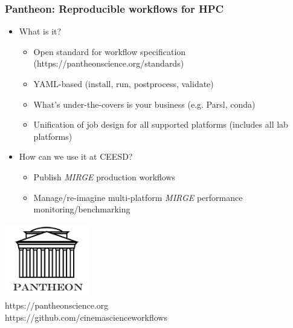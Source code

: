 \begin{frame}\frametitle{Pantheon: Reproducible workflows for HPC}
\begin{multicols}{2}
\begin{itemize}
\item What is it?
\begin{itemize}
\item Open standard for workflow specification (https://pantheonscience.org/standards)
\item YAML-based (install, run, postprocess, validate)
\item What's under-the-covers is your business  (e.g. Parsl, conda)
\item Unification of job design for all supported platforms (includes all lab platforms)
\end{itemize}
\item How can we use it at CEESD?
\begin{itemize}
\item Publish \textit{MIRGE} production workflows
\item Manage/re-imagine multi-platform \textit{MIRGE} performance monitoring/benchmarking
\end{itemize}
\end{itemize}
\end{multicols}
\begin{center}
\includegraphics[width=.2\textwidth]{figures/pantheon.png}\\
https://pantheonscience.org\\
https://github.com/cinemascienceworkflows
\end{center}
\end{frame}



